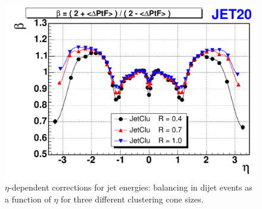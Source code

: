 \begin{singlespace}
\begin{enumerate}
\end{enumerate}
\end{singlespace}

\begin{figure}[p]
 \centering
 \includegraphics[scale=0.35,keepaspectratio=true]{./JetCorrections_EtaDependence.png}
\caption{$\eta$-dependent corrections for jet energies: \pt balancing in dijet events as a function of $\eta$ for three different clustering cone sizes.}
 \label{fig:JetCorrections_EtaDependence}
\end{figure}

